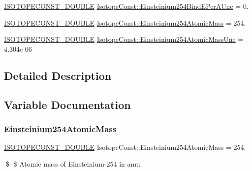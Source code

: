 \begin{DoxyCompactItemize}
\item 
\mbox{\hyperlink{group___isotope_const-_macros_ga8f45a7272ce02c0b4c65c44636ed719a}{I\+S\+O\+T\+O\+P\+E\+C\+O\+N\+S\+T\+\_\+\+D\+O\+U\+B\+LE}} \mbox{\hyperlink{group___isotope_const-_einsteinium-_es254_ga8d0597af7977c97a56296c7f94201925}{Isotope\+Const\+::\+Einsteinium254\+Bind\+E\+Per\+A\+Unc}} = 0.
\item 
\mbox{\hyperlink{group___isotope_const-_macros_ga8f45a7272ce02c0b4c65c44636ed719a}{I\+S\+O\+T\+O\+P\+E\+C\+O\+N\+S\+T\+\_\+\+D\+O\+U\+B\+LE}} \mbox{\hyperlink{group___isotope_const-_einsteinium-_es254_gac90a99d4898ee1d9320d2e8e9e931a79}{Isotope\+Const\+::\+Einsteinium254\+Atomic\+Mass}} = 254.
\item 
\mbox{\hyperlink{group___isotope_const-_macros_ga8f45a7272ce02c0b4c65c44636ed719a}{I\+S\+O\+T\+O\+P\+E\+C\+O\+N\+S\+T\+\_\+\+D\+O\+U\+B\+LE}} \mbox{\hyperlink{group___isotope_const-_einsteinium-_es254_ga8fd096e3fb5feac8f5c5cbde8ea05530}{Isotope\+Const\+::\+Einsteinium254\+Atomic\+Mass\+Unc}} = 4.\+304e-\/06
\end{DoxyCompactItemize}


\subsection{Detailed Description}


\subsection{Variable Documentation}
\mbox{\label{group___isotope_const-_einsteinium-_es254_gac90a99d4898ee1d9320d2e8e9e931a79}} 
\subsubsection{\texorpdfstring{Einsteinium254\+Atomic\+Mass}{Einsteinium254AtomicMass}}
{\footnotesize\ttfamily \mbox{\hyperlink{group___isotope_const-_macros_ga8f45a7272ce02c0b4c65c44636ed719a}{I\+S\+O\+T\+O\+P\+E\+C\+O\+N\+S\+T\+\_\+\+D\+O\+U\+B\+LE}} Isotope\+Const\+::\+Einsteinium254\+Atomic\+Mass = 254.}

\$ \$ Atomic mass of Einsteinium-\/254 in amu. \mbox{\label{group___isotope_const-_einsteinium-_es254_ga8fd096e3fb5feac8f5c5cbde8ea05530}} 
